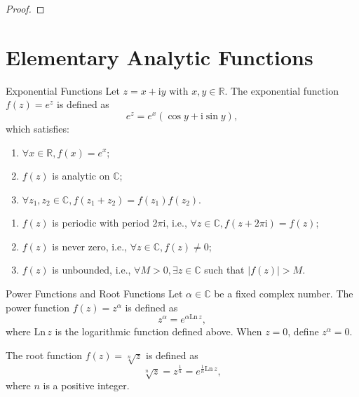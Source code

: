 \begin{proof}
    
\end{proof}

\section{Elementary Analytic Functions} %
\begin{definition}{Exponential Functions}
    Let \(z=x+\mathrm{i}y\) with \(x, y \in \mathbb{R}\). The exponential function \(f(z) = e^z\) is defined as
    \[
    e^z = e^x (\cos y + \mathrm{i} \sin y),
    \]
    which satisfies:
    \begin{enumerate}
        \item \(\forall x\in \mathbb{R}, f(x)=e^x\); 
        \item \(f(z)\) is analytic on \(\mathbb{C}\);
        \item \(\forall z_1, z_2 \in \mathbb{C}, f(z_1 + z_2) = f(z_1) f(z_2)\).
    \end{enumerate}
\end{definition}

\begin{property}
    \begin{enumerate}
        \item \(f(z)\) is periodic with period \(2\pi \mathrm{i}\), i.e., \(\forall z \in \mathbb{C}, f(z + 2\pi \mathrm{i}) = f(z)\);
        \item \(f(z)\) is never zero, i.e., \(\forall z \in \mathbb{C}, f(z) \neq 0\);
        \item \(f(z)\) is unbounded, i.e., \(\forall M > 0, \exists z \in \mathbb{C}\) such that \(|f(z)| > M\).
    \end{enumerate}
\end{property}


\vspace{0.7cm}
\begin{definition}{Power Functions and Root Functions}
    Let \(\alpha \in \mathbb{C}\) be a fixed complex number. The power function \(f(z) = z^\alpha\) is defined as
    \[
    z^\alpha = e^{\alpha \mathrm{Ln}\, z},
    \]
    where \(\mathrm{Ln}\, z\) is the logarithmic function defined above.
    When \(z=0\), define \(z^{\alpha} =0\).
    
    The root function \(f(z) = \sqrt[n]{z}\) is defined as
    \[
    \sqrt[n]{z} = z^{\frac{1}{n}} = e^{\frac{1}{n} \mathrm{Ln}\, z},
    \]
    where \(n\) is a positive integer.
\end{definition}


